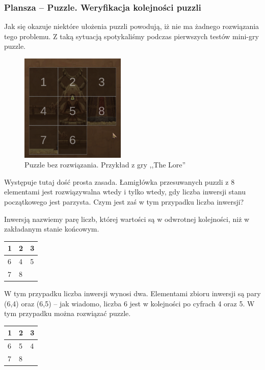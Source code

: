 \documentclass[oneside,polski,logo]{amuthesis}
\begin{document}
\subsubsection{Plansza – Puzzle. Weryfikacja kolejności puzzli}
\par Jak się okazuje niektóre ułożenia puzzli powodują, iż nie ma żadnego rozwiązania tego problemu. Z taką sytuacją spotykaliśmy podczas pierwszych testów mini-gry puzzle. 
\begin{figure}[h]
	\centering
	\includegraphics[width=5cm]{images/tyrek/puzzle_1.png}
	\caption{Puzzle bez rozwiązania. Przykład z gry ,,The Lore''}
\end{figure}

Występuje tutaj dość prosta zasada. Łamigłówka przesuwanych puzzli z 8 elementami jest rozwiązywalna wtedy i tylko wtedy, gdy liczba inwersji stanu początkowego jest parzysta. Czym jest zaś w tym przypadku liczba inwersji?

Inwersją nazwiemy parę liczb, której wartości są w odwrotnej kolejności, niż w zakładanym stanie końcowym. \cite{solvablePuzzle}

\begin{center}
\begin{tabular}{ | m{5em} | m{1cm}| m{1cm} | } 
\hline
 1 & 2 & 3 \\ 
\hline
 6 & 4 & 5 \\
\hline  
 7 & 8 &     \\
\hline
\end{tabular}
\end{center}

W tym przypadku liczba inwersji wynosi dwa. Elementami zbioru inwersji są pary (6,4) oraz (6,5) – jak wiadomo, liczba 6 jest w kolejności po cyfrach 4 oraz 5. W tym przypadku można rozwiązać puzzle.

\begin{center}
\begin{tabular}{ | m{5em} | m{1cm}| m{1cm} | } 
\hline
 1 & 2 & 3 \\ 
\hline
 6 & 5 & 4 \\  
\hline
 7 & 8 &     \\
\hline
\end{tabular}
\end{center}
\end{document}
